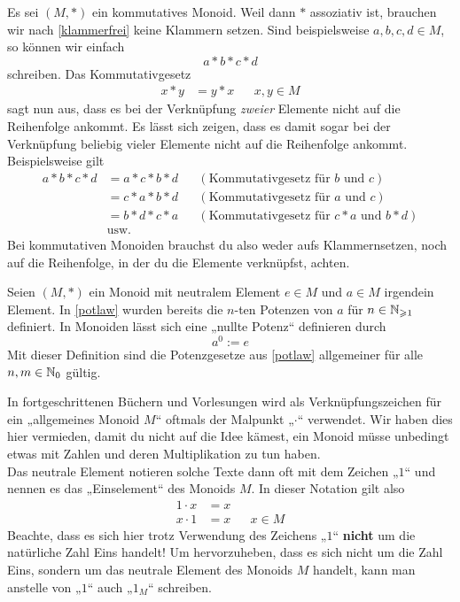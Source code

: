 \begin{bem}
Es sei $(M,*)$ ein kommutatives Monoid. Weil dann $*$ assoziativ ist, brauchen wir nach \cref{klammerfrei} keine Klammern setzen. Sind beispielsweise $a,b,c,d\in M$, so können wir einfach
\[ a*b*c*d \]
schreiben. Das Kommutativgesetz
\begin{align*}
  x*y&=y*x && x,y\in M
\end{align*}
sagt nun aus, dass es bei der Verknüpfung \emph{zweier} Elemente nicht auf die Reihenfolge ankommt. Es lässt sich zeigen, dass es damit sogar bei der Verknüpfung beliebig vieler Elemente nicht auf die Reihenfolge ankommt. Beispielsweise gilt
\begin{align*}
 a*b*c*d & = a*c*b*d && (\text{Kommutativgesetz für $b$ und $c$}) \\
 & = c*a*b*d && (\text{Kommutativgesetz für $a$ und $c$}) \\
 & = b*d*c*a && (\text{Kommutativgesetz für $c*a$ und $b*d$}) \\
 & \text{usw.}
\end{align*}
Bei kommutativen Monoiden brauchst du also weder aufs Klammernsetzen, noch auf die Reihenfolge, in der du die Elemente verknüpfst, achten.
\end{bem}



\begin{de}
 Seien $(M,*)$ ein Monoid mit neutralem Element $e\in M$ und $a\in M$ irgendein Element. In \cref{potlaw} wurden bereits die $n$-ten Potenzen von $a$ für $n\in {\mathbb N}_{\geqslant 1}$ definiert. In Monoiden lässt sich eine „nullte Potenz“ definieren durch
 \[ a^0 := e \]
Mit dieser Definition sind die Potenzgesetze aus \cref{potlaw} allgemeiner für alle $n,m\in {\mathbb N}_0$ gültig.
\end{de}



\begin{bem}
 In fortgeschrittenen Büchern und Vorlesungen wird als Verknüpfungszeichen für ein „allgemeines Monoid $M$“ oftmals der Malpunkt „$\cdot$“ verwendet. Wir haben dies hier vermieden, damit du nicht auf die Idee kämest, ein Monoid müsse unbedingt etwas mit Zahlen und deren Multiplikation zu tun haben. \\
 Das neutrale Element notieren solche Texte dann oft mit dem Zeichen „$1$“ und nennen es das „Einselement“ des Monoids $M$. In dieser Notation gilt also
 \begin{align*}
  1\cdot x & = x \\
  x \cdot 1 & = x && x\in M
 \end{align*}
 Beachte, dass es sich hier trotz Verwendung des Zeichens „$1$“ \textbf{nicht} um die natürliche Zahl Eins handelt! Um hervorzuheben, dass es sich nicht um die Zahl Eins, sondern um das neutrale Element des Monoids $M$ handelt, kann man anstelle von „$1$“ auch „$1_M$“ schreiben.
\end{bem}





